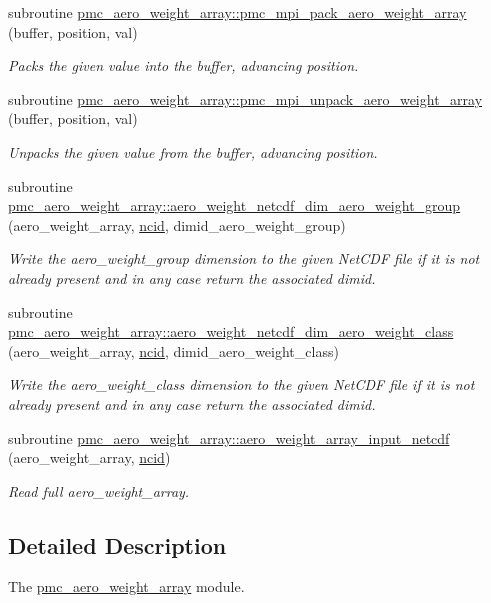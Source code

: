 \begin{DoxyCompactItemize}
subroutine \mbox{\hyperlink{namespacepmc__aero__weight__array_a0e7bdd9d7cf073e1d57c331a46a90d3a}{pmc\+\_\+aero\+\_\+weight\+\_\+array\+::pmc\+\_\+mpi\+\_\+pack\+\_\+aero\+\_\+weight\+\_\+array}} (buffer, position, val)
\begin{DoxyCompactList}\small\item\em Packs the given value into the buffer, advancing position. \end{DoxyCompactList}\item 
subroutine \mbox{\hyperlink{namespacepmc__aero__weight__array_a8f07bda93e7ef86eb3f39034f8b8e5f2}{pmc\+\_\+aero\+\_\+weight\+\_\+array\+::pmc\+\_\+mpi\+\_\+unpack\+\_\+aero\+\_\+weight\+\_\+array}} (buffer, position, val)
\begin{DoxyCompactList}\small\item\em Unpacks the given value from the buffer, advancing position. \end{DoxyCompactList}\item 
subroutine \mbox{\hyperlink{namespacepmc__aero__weight__array_a7b61181ea630c3bf41cf13124c206226}{pmc\+\_\+aero\+\_\+weight\+\_\+array\+::aero\+\_\+weight\+\_\+netcdf\+\_\+dim\+\_\+aero\+\_\+weight\+\_\+group}} (aero\+\_\+weight\+\_\+array, \mbox{\hyperlink{fractal_8_f90_a4e89f3f850921ff84a6dfce8b166ad50}{ncid}}, dimid\+\_\+aero\+\_\+weight\+\_\+group)
\begin{DoxyCompactList}\small\item\em Write the {\ttfamily aero\+\_\+weight\+\_\+group} dimension to the given Net\+C\+DF file if it is not already present and in any case return the associated dimid. \end{DoxyCompactList}\item 
subroutine \mbox{\hyperlink{namespacepmc__aero__weight__array_a2a35954eccffa6d2706b58fe27dde736}{pmc\+\_\+aero\+\_\+weight\+\_\+array\+::aero\+\_\+weight\+\_\+netcdf\+\_\+dim\+\_\+aero\+\_\+weight\+\_\+class}} (aero\+\_\+weight\+\_\+array, \mbox{\hyperlink{fractal_8_f90_a4e89f3f850921ff84a6dfce8b166ad50}{ncid}}, dimid\+\_\+aero\+\_\+weight\+\_\+class)
\begin{DoxyCompactList}\small\item\em Write the {\ttfamily aero\+\_\+weight\+\_\+class} dimension to the given Net\+C\+DF file if it is not already present and in any case return the associated dimid. \end{DoxyCompactList}\item 
subroutine \mbox{\hyperlink{namespacepmc__aero__weight__array_a11210bfed165f0953131f08759fca5a0}{pmc\+\_\+aero\+\_\+weight\+\_\+array\+::aero\+\_\+weight\+\_\+array\+\_\+input\+\_\+netcdf}} (aero\+\_\+weight\+\_\+array, \mbox{\hyperlink{fractal_8_f90_a4e89f3f850921ff84a6dfce8b166ad50}{ncid}})
\begin{DoxyCompactList}\small\item\em Read full aero\+\_\+weight\+\_\+array. \end{DoxyCompactList}\end{DoxyCompactItemize}


\subsection{Detailed Description}
The \mbox{\hyperlink{namespacepmc__aero__weight__array}{pmc\+\_\+aero\+\_\+weight\+\_\+array}} module. 

